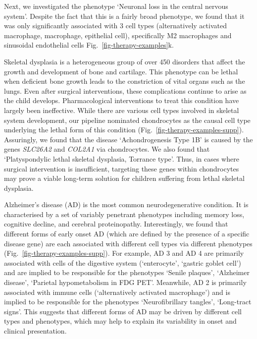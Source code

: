 \documentclass[
]{article}
\begin{document}
Next, we investigated the phenotype `Neuronal loss in the central
nervous system'. Despite the fact that this is a fairly broad phenotype,
we found that it was only significantly associated with 3 cell types
(alternatively activated macrophage, macrophage, epithelial cell),
specifically M2 macrophages and sinusoidal endothelial cells
Fig.~\ref{fig-therapy-examples}k.

Skeletal dysplasia is a heterogeneous group of over 450 disorders that
affect the growth and development of bone and cartilage. This phenotype
can be lethal when deficient bone growth leads to the constriction of
vital organs such as the lungs. Even after surgical interventions, these
complications continue to arise as the child develops. Pharmacological
interventions to treat this condition have largely been ineffective.
While there are various cell types involved in skeletal system
development, our pipeline nominated chondrocytes as the causal cell type
underlying the lethal form of this condition
(Fig.~\ref{fig-therapy-examples-supp}). Assuringly, we found that the
disease `Achondrogenesis Type 1B' is caused by the genes \emph{SLC26A2}
and \emph{COL2A1} via chondrocytes. We also found that `Platyspondylic
lethal skeletal dysplasia, Torrance type'. Thus, in cases where surgical
intervention is insufficient, targeting these genes within chondrocytes
may prove a viable long-term solution for children suffering from lethal
skeletal dysplasia.

Alzheimer's disease (AD) is the most common neurodegenerative condition.
It is characterised by a set of variably penetrant phenotypes including
memory loss, cognitive decline, and cerebral proteinopathy.
Interestingly, we found that different forms of early onset AD (which
are defined by the presence of a specific disease gene) are each
associated with different cell types via different phenotypes
(Fig.~\ref{fig-therapy-examples-supp}). For example, AD 3 and AD 4 are
primarily associated with cells of the digestive system (`enterocyte',
`gastric goblet cell') and are implied to be responsible for the
phenotypes `Senile plaques', `Alzheimer disease', `Parietal
hypometabolism in FDG PET'. Meanwhile, AD 2 is primarily associated with
immune cells (`alternatively activated macrophage') and is implied to be
responsible for the phenotypes `Neurofibrillary tangles', `Long-tract
signs'. This suggests that different forms of AD may be driven by
different cell types and phenotypes, which may help to explain its
variability in onset and clinical presentation.
\end{document}
